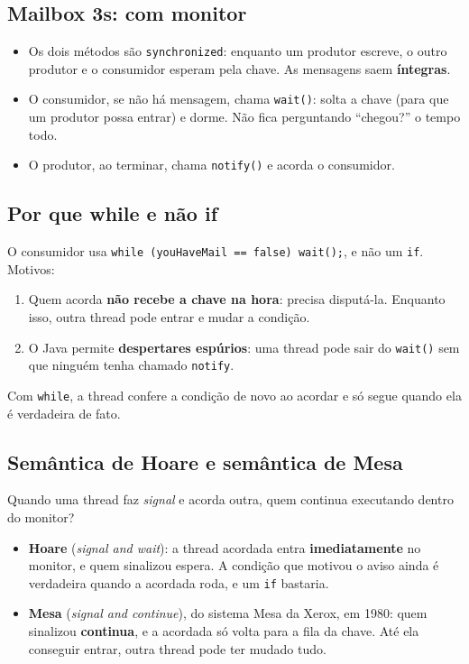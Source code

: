 \documentclass[11pt,a4paper]{article}
\newcommand{\raiz}{../../../..}
\newcommand{\cmd}[1]{\texttt{#1}}
\begin{document}
\subsection{Mailbox 3s: com monitor}



\begin{itemize}
    \item Os dois métodos são \cmd{synchronized}: enquanto um produtor escreve, o outro produtor e o consumidor esperam pela chave. As mensagens saem \textbf{íntegras}.
    \item O consumidor, se não há mensagem, chama \cmd{wait()}: solta a chave (para que um produtor possa entrar) e dorme. Não fica perguntando ``chegou?'' o tempo todo.
    \item O produtor, ao terminar, chama \cmd{notify()} e acorda o consumidor.
\end{itemize}

\subsection{Por que while e não if}

O consumidor usa \cmd{while (youHaveMail == false) wait();}, e não um \cmd{if}. Motivos:

\begin{enumerate}
    \item Quem acorda \textbf{não recebe a chave na hora}: precisa disputá-la. Enquanto isso, outra thread pode entrar e mudar a condição.
    \item O Java permite \textbf{despertares espúrios}: uma thread pode sair do \cmd{wait()} sem que ninguém tenha chamado \cmd{notify}.
\end{enumerate}

Com \cmd{while}, a thread confere a condição de novo ao acordar e só segue quando ela é verdadeira de fato.

\subsection{Semântica de Hoare e semântica de Mesa}

Quando uma thread faz \emph{signal} e acorda outra, quem continua executando dentro do monitor?

\begin{itemize}
    \item \textbf{Hoare} (\emph{signal and wait}): a thread acordada entra \textbf{imediatamente} no monitor, e quem sinalizou espera. A condição que motivou o aviso ainda é verdadeira quando a acordada roda, e um \cmd{if} bastaria.
    \item \textbf{Mesa} (\emph{signal and continue}), do sistema Mesa da Xerox, em 1980: quem sinalizou \textbf{continua}, e a acordada só volta para a fila da chave. Até ela conseguir entrar, outra thread pode ter mudado tudo.
\end{itemize}
\end{document}
